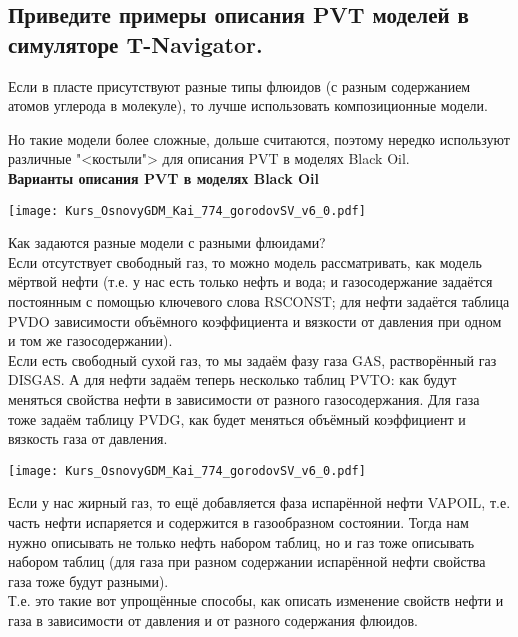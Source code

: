 

\subsection{Приведите примеры описания PVT моделей в симуляторе T-Navigator.}

Если в пласте присутствуют разные типы флюидов (с разным содержанием атомов углерода в молекуле), то лучше использовать композиционные модели.

Но такие модели более сложные, дольше считаются, поэтому нередко используют различные "<костыли"> для описания PVT в моделях Black Oil.
\\

\textbf{Варианты описания PVT в моделях Black Oil}

\texttt{[image: Kurs\_OsnovyGDM\_Kai\_774\_gorodovSV\_v6\_0.pdf]}

Как задаются разные модели с разными флюидами?
\\

Если отсутствует свободный газ, то можно модель рассматривать, как модель мёртвой нефти (т.е. у нас есть только нефть и вода; и газосодержание задаётся постоянным с помощью ключевого слова RSCONST; для нефти задаётся таблица PVDO зависимости объёмного коэффициента и вязкости от давления при одном и том же газосодержании).
\\

Если есть свободный сухой газ, то мы задаём фазу газа GAS, растворённый газ DISGAS.
А для нефти задаём теперь несколько таблиц PVTO: как будут меняться свойства нефти в зависимости от разного газосодержания.
Для газа тоже задаём таблицу PVDG, как будет меняться объёмный коэффициент и вязкость газа от давления.

\texttt{[image: Kurs\_OsnovyGDM\_Kai\_774\_gorodovSV\_v6\_0.pdf]}

Если у нас жирный газ, то ещё добавляется фаза испарённой нефти VAPOIL, т.е. часть нефти испаряется и содержится в газообразном состоянии.
Тогда нам нужно описывать не только нефть набором таблиц, но и газ тоже описывать набором таблиц (для газа при разном содержании испарённой нефти свойства газа тоже будут разными).
\\

Т.е. это такие вот упрощённые способы, как описать изменение свойств нефти и газа в зависимости от давления и от разного содержания флюидов.


